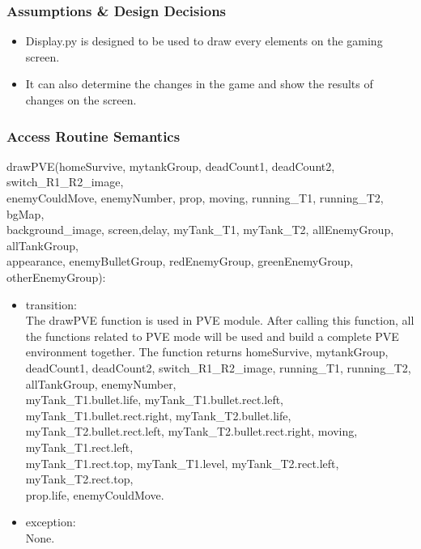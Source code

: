 \documentclass[12pt, titlepage]{article}
\begin{document}
		\subsubsection{Assumptions \& Design Decisions}
		\begin{itemize}
		\item Display.py is designed to be used to draw every elements on the gaming screen.
		
		\item It can also determine the changes in the game and show the results of changes on the screen.
		
		\end{itemize}
		\subsubsection{Access Routine Semantics}
		
	    drawPVE(homeSurvive, mytankGroup, deadCount1, deadCount2, switch\_R1\_R2\_image, \\enemyCouldMove, enemyNumber, prop, moving, running\_T1, running\_T2, bgMap, \\background\_image, screen,delay, myTank\_T1, myTank\_T2, allEnemyGroup, allTankGroup, \\appearance, enemyBulletGroup, redEnemyGroup, greenEnemyGroup, otherEnemyGroup):
	    \begin{itemize}
	    \item transition:\\
	    The drawPVE function is used in PVE module. After calling this function, all the functions related to PVE mode will be used and build a complete PVE environment together. The function returns homeSurvive, mytankGroup, deadCount1, deadCount2, switch\_R1\_R2\_image, running\_T1, running\_T2, allTankGroup, enemyNumber, \\myTank\_T1.bullet.life, myTank\_T1.bullet.rect.left, \\myTank\_T1.bullet.rect.right, myTank\_T2.bullet.life, \\myTank\_T2.bullet.rect.left, myTank\_T2.bullet.rect.right, moving, myTank\_T1.rect.left,\\ myTank\_T1.rect.top, myTank\_T1.level, myTank\_T2.rect.left, myTank\_T2.rect.top, \\prop.life, enemyCouldMove.\\
	    
	    \item exception:\\ None.
	    \end{itemize}
	    
\end{document}
